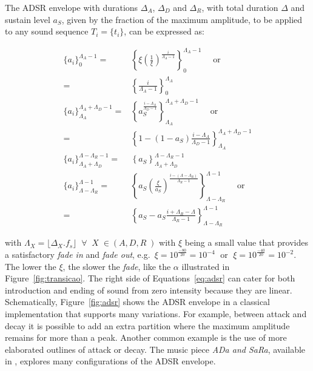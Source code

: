 The ADSR envelope with durations $\Delta_A$, $\Delta_D$ and $\Delta_R$, with total duration $\Delta$ and sustain level $a_S$, given by the fraction of the maximum amplitude, to be applied to any sound sequence $T_i=\{t_i\}$, can be expressed as:

\begin{equation}\label{eq:adsr}
\begin{split}
\{a_i\}_0^{\Lambda_A-1}  = & \left\{\xi\left(\frac{1}{\xi}\right)^{\frac{i}{\Lambda_A-1}}\right\}_0^{\Lambda_A-1} \quad \text{ or }\\ = & \left\{\frac{i}{\Lambda_A-1}\right\}_0^{\Lambda_A}\\
\{a_i\}_{\Lambda_A}^{\Lambda_A+\Lambda_D-1} = & \left\{a_S^{\frac{i-\Lambda_A}{\Lambda_D-1}}  \right\}_{\Lambda_A}^{\Lambda_A+\Lambda_D-1} \quad \text{ or } \\ = &  \left\{1-(1-a_S)\frac{i-\Lambda_A}{\Lambda_D-1}\right\}_{\Lambda_A}^{\Lambda_A+\Lambda_D-1}\\
\{ a_i \}_{\Lambda_A+\Lambda_D}^{\Lambda-\Lambda_R-1} = & \left\{ a_S \right\}_{\Lambda_A+\Lambda_D}^{\Lambda-\Lambda_R-1} \\
\{ a_i \}_{\Lambda-\Lambda_R}^{\Lambda-1}  = & \left\{ a_S\left(\frac{\xi}{a_S} \right)^{\frac{i-(\Lambda-\Lambda_R)}{\Lambda_R-1}} \right\}_{\Lambda-\Lambda_R}^{\Lambda-1} \quad \text{ or } \\ = &  \left\{ a_S - a_S\frac{i+\Lambda_R-\Lambda}{\Lambda_R-1}\right\}_{\Lambda-\Lambda_R}^{\Lambda-1} 
\end{split}
\end{equation}


\noindent with $\Lambda_X=\lfloor \Delta_X . f_s \rfloor\;\;\forall\;\; X \; \in
(A,D,R\;)$ with $\xi$ being a small value that provides a satisfactory \emph{fade in} and \emph{fade out}, e.g.\ $\xi=10^{\frac{-80}{20}}=10^{-4}\;$ or $\;\xi=10^{\frac{-40}{20}}=10^{-2}$. The lower the $\xi$, the slower the \emph{fade}, like the $\alpha$ illustrated in Figure~\ref{fig:transicao}. The right side of Equations~\ref{eq:adsr} can cater for both introduction and ending of sound from zero intensity because they are linear. Schematically, Figure~\ref{fig:adsr} shows the ADSR envelope in a classical implementation that supports many variations. For example, between attack and decay it is possible to add an extra partition where the maximum amplitude remains for more than a peak. Another common example is the use of more elaborated outlines of attack or decay. The music piece \emph{ADa and SaRa}, available 
in \massa, explores many configurations of the ADSR envelope.

